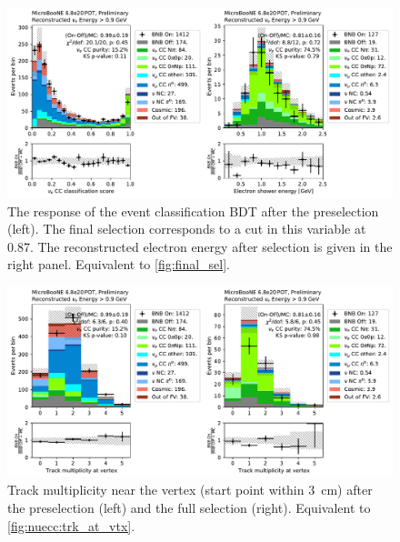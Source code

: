 \begin{figure}[htb] 
    \centering
    \includegraphics[height=0.27\textheight]{Sidebands/Figures/nuecc/run123/event_bdt.pdf}
\caption{\label{fig:nuecc:sideband:bdt} The response of the \nuecc event classification BDT after the preselection (left). The final selection corresponds to a cut in this variable at 0.87. The reconstructed electron energy after selection is given in the right panel. Equivalent to \cref{fig:final_sel}.}
\end{figure}

\begin{figure}[htb] 
    \centering
    \includegraphics[height=0.27\textheight]{Sidebands/Figures/nuecc/run123/event_trk_at_vtx.pdf}
\caption{\label{fig:nuecc:sideband:trk_vtx} Track multiplicity near the vertex (start point within \SI{3}{\cm}) after the preselection (left) and the full \nuecc selection (right). Equivalent to \cref{fig:nuecc:trk_at_vtx}.}
\end{figure}

